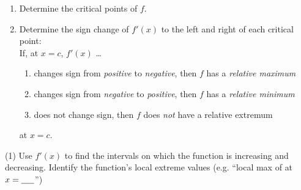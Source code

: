 \documentclass[../mathNotesPreamble]{subfiles}
\begin{document}
  \begin{thmBox*}
    \newcommand{\minMaxPlot}{

    }
    \begin{enumerate}
      \item Determine the critical points of $f$.
      \item Determine the sign change of $f'(x)$ to the left and right of each critical point:\\
        If, at $x=c$, $f'(x)$ \dots
        \begin{enumerate}
          \item changes sign from \emph{positive} to \emph{negative}, then $f$ has a \emph{relative maximum} \hfill
          \item changes sign from \emph{negative} to \emph{positive}, then $f$ has a \emph{relative minimum} \hfill
          \item does not change sign, then $f$ does \emph{not} have a relative extremum
        \end{enumerate}
        at $x=c$.
    \end{enumerate}
  \end{thmBox*}

  \begin{extasks}[after-item-skip=\stretch{1}](1)
    \task Use $f'(x)$ to find the intervals on which the function is increasing and decreasing.
    \task Identify the function's local extreme values \hfill
      (e.g. ``local max of \underline{\hspace*{15pt}} at $x=\underline{\hspace*{15pt}}$'')
  \end{extasks}
  \pagebreak
\end{document}
